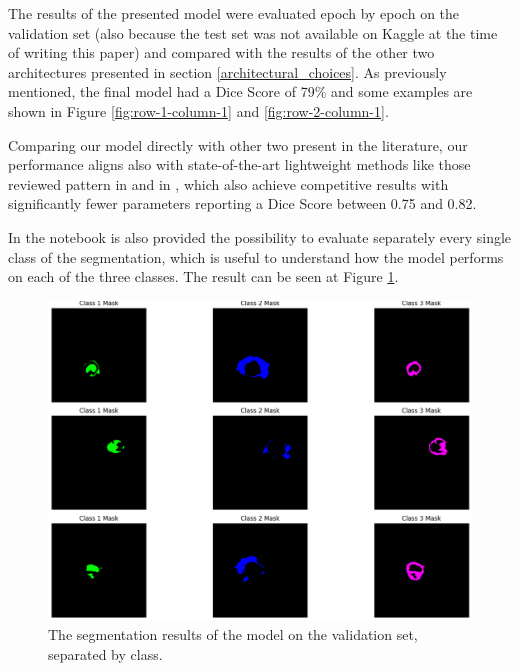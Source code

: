 \documentclass[10pt,twocolumn,letterpaper]{article}
\begin{document}
The results of the presented model were evaluated epoch by epoch on the validation set (also because the test set was not available on Kaggle at the time of writing this paper) and compared with the results of the other two architectures presented in section \ref{architectural_choices}.
As previously mentioned, the final model had a Dice Score of 79\% and some examples are shown in Figure \ref{fig:row-1-column-1} and \ref{fig:row-2-column-1}.

Comparing our model directly with other two present in the literature, our performance aligns also with state-of-the-art lightweight methods like those reviewed pattern in \cite{An2024DWKD} and in \cite{Gutierrez2024Brain}, which also achieve competitive results with significantly fewer parameters reporting a Dice Score between 0.75 and 0.82.

In the notebook is also provided the possibility to evaluate separately every single class of the segmentation, which is useful to understand how the model performs on each of the three classes. The result can be seen at Figure \ref{tab:results}.

\begin{figure}
\centering
\includegraphics[width=\linewidth]{img/SeparatedColor.png}
\caption{The segmentation results of the model on the validation set, separated by class.}
\label{tab:results}
\end{figure}
\end{document}

